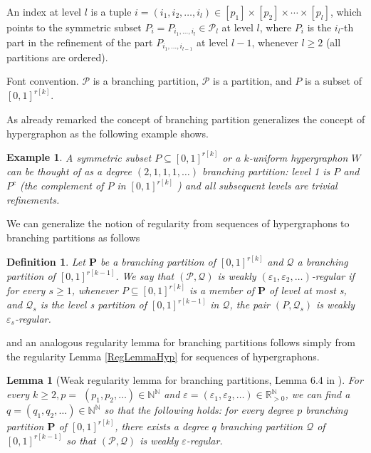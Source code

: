 \documentclass[11pt]{article}
\newtheorem{lemma}[theorem]{Lemma}
\newtheorem{definition}[theorem]{Definition}
\newtheorem{example}[theorem]{Example}
\begin{document}
An index at level $l$ is a tuple $i=\left(i_1, i_2, \ldots, i_l\right) \in\left[p_1\right] \times\left[p_2\right] \times \cdots \times\left[p_l\right]$, which points to the symmetric subset $P_i=P_{i_1, \ldots, i_l} \in \mathcal{P}_l$ at level $l$, where $P_i$ is the $i_l$-th part in the refinement of the part $P_{i_1, \ldots, i_{l-1}}$ at level $l-1$, whenever $l \geq 2$ (all partitions are ordered).


Font convention. $\mathscr{P}$ is a branching partition, $\mathcal{P}$ is a partition, and $P$ is a subset of $[0,1]^{r[k]}$.

As already remarked the concept of branching partition generalizes the concept of hypergraphon as the following example shows.

\begin{example}\label{ExBranParHyper} A symmetric subset $P \subseteq[0,1]^{r[k]}$ or a $k$-uniform hypergraphon $W$ can be thought of as a degree $(2,1,1,1, \ldots)$ branching partition: level 1 is $P$ and $P^c$ (the complement of $P$ in $[0,1]^{r[k]}$ ) and all subsequent levels are trivial refinements.
\end{example}

We can generalize the notion of regularity from sequences of hypergraphons to branching partitions as follows

\begin{definition}
 Let $\boldsymbol{P}$ be a branching partition of $[0,1]^{r[k]}$ and $\mathscr{Q}$ a branching partition of $[0,1]^{r[k-1]}$. We say that $(\mathscr{P}, \mathscr{Q})$ is weakly $\left(\varepsilon_1, \varepsilon_2, \ldots\right)$-regular if for every $s \geq 1$, whenever $P \subseteq[0,1]^{r[k]}$ is a member of $\boldsymbol{P}$ of level at most s, and $\mathcal{Q}_s$ is the level s partition of $[0,1]^{r[k-1]}$ in $\mathscr{Q}$, the pair $\left(P, \mathcal{Q}_s\right)$ is weakly $\varepsilon_s$-regular.   
\end{definition}

and an analogous regularity lemma  for branching partitions follows simply from the regularity Lemma \ref{RegLemmaHyp} for sequences of hypergraphons.

\begin{lemma}[Weak regularity lemma for branching partitions, Lemma 6.4 in \cite{HypergraphonsZhao}] For every $k \geq 2, p=$ $\left(p_1, p_2, \ldots\right) \in \mathbb{N}^{\mathbb{N}}$ and $\varepsilon=\left(\varepsilon_1, \varepsilon_2, \ldots\right) \in \mathbb{R}_{>0}^{\mathbb{N}}$, we can find a $q=\left(q_1, q_2, \ldots\right) \in \mathbb{N}^{\mathbb{N}}$ so that the following holds: for every degree $p$ branching partition $\boldsymbol{P}$ of $[0,1]^{r[k]}$, there exists a degree $q$ branching partition $\mathscr{Q}$ of $[0,1]^{r[k-1]}$ so that $(\mathscr{P}, \mathscr{Q})$ is weakly $\varepsilon$-regular.
\end{lemma}
\end{document}
